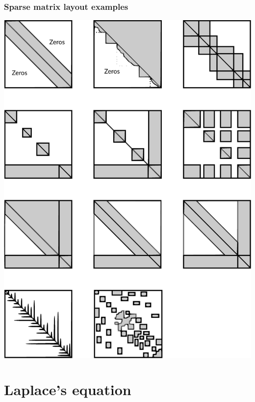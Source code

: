 \documentclass[11pt,table,final,xcolor={usenames,dvipsnames,table}]{beamer}
\begin{document}
\begin{frame}[fragile]
  \frametitle{Sparse matrix layout examples}
  \begin{center}
   \includegraphics[height=0.8\textheight]{img/sparse-overview}
  \end{center}
\end{frame}

\section{Laplace's equation}
\end{document}
